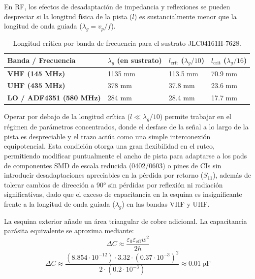 \documentclass[11pt,a4paper,twoside]{report}
\begin{document}
	En RF, los efectos de desadaptación de impedancia y reflexiones se pueden despreciar si la longitud física de la pista ($l$) es sustancialmente menor que la longitud de onda guiada ($\lambda_g = v_p / f$).\newline
	
	\begin{table}[htbp]
		\centering
		\label{tab:longitud_critica}
		\begin{tabular}{llll}
			\hline
			\textbf{Banda / Frecuencia} & $\lambda_g$ \textbf{(en sustrato)} & $l_{\mathrm{crit}}$ ($\lambda_g / 10$) & $l_{\mathrm{crit}}$ ($\lambda_g / 16$) \\ \hline
			\textbf{VHF (145 MHz)} & 1135 mm & 113.5 mm & 70.9 mm \\
			\textbf{UHF (435 MHz)} & 378 mm & 37.8 mm & 23.6 mm \\
			\textbf{LO / ADF4351 (580 MHz)} & 284 mm & 28.4 mm & 17.7 mm \\ \hline
		\end{tabular}
		\caption{Longitud crítica por banda de frecuencia para el sustrato JLC04161H-7628.}
	\end{table}
	
	Operar por debajo de la longitud crítica ($l \ll \lambda_g/10$) permite trabajar en el régimen de parámetros concentrados, donde el desfase de la señal a lo largo de la pista es despreciable y el trazo actúa como una simple interconexión equipotencial. Esta condición otorga una gran flexibilidad en el ruteo, permitiendo modificar puntualmente el ancho de pista para adaptarse a los pads de componentes SMD de escala reducida (0402/0603) o pines de CIs sin introducir desadaptaciones apreciables en la pérdida por retorno ($S_{11}$), además de tolerar cambios de dirección a 90° sin pérdidas por reflexión ni radiación significativas, dado que el exceso de capacitancia en la esquina es insignificante frente a la longitud de onda guiada ($\lambda_g$) en las bandas VHF y UHF.
	
	La esquina exterior añade un área triangular de cobre adicional. La capacitancia parásita equivalente se aproxima mediante:
	\begin{equation}
		\Delta C \approx \frac{\varepsilon_0 \varepsilon_{\mathrm{eff}} w^2}{2 h}
	\end{equation}
	\begin{equation}
		\Delta C \approx \frac{(8.854 \cdot 10^{-12}) \cdot 3.32 \cdot (0.37 \cdot 10^{-3})^2}{2 \cdot (0.2 \cdot 10^{-3})} \approx 0.01\ \mathrm{pF}
	\end{equation}
	
\end{document}
